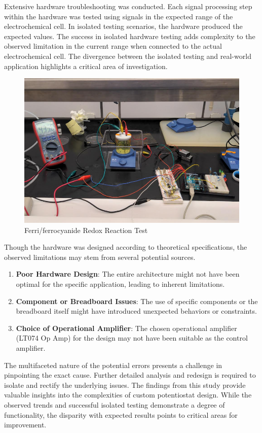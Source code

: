 \documentclass{article}
\begin{document}
Extensive hardware troubleshooting was conducted. Each signal processing step within the hardware was tested using signals in the expected range of the electrochemical cell. In isolated testing scenarios, the hardware produced the expected values. The success in isolated hardware testing adds complexity to the observed limitation in the current range when connected to the actual electrochemical cell. The divergence between the isolated testing and real-world application highlights a critical area of investigation.

\begin{figure}[H]
  \centering
  \includegraphics[width=.9\linewidth]{lab_test.png}
  \caption{Ferri/ferrocyanide Redox Reaction Test}
  \end{figure}
  

Though the hardware was designed according to theoretical specifications, the observed limitations may stem from several potential sources.
\begin{enumerate}
\item \textbf{Poor Hardware Design}: The entire architecture might not have been optimal for the specific application, leading to inherent limitations.
\item \textbf{Component or Breadboard Issues}: The use of specific components or the breadboard itself might have introduced unexpected behaviors or constraints.
\item \textbf{Choice of Operational Amplifier}: The chosen operational amplifier (LT074 Op Amp) for the design may not have been suitable as the control amplifier.
\end{enumerate}

The multifaceted nature of the potential errors presents a challenge in pinpointing the exact cause. Further detailed analysis and redesign is required to isolate and rectify the underlying issues. The findings from this study provide valuable insights into the complexities of custom potentiostat design. While the observed trends and successful isolated testing demonstrate a degree of functionality, the disparity with expected results points to critical areas for improvement.
\end{document}
